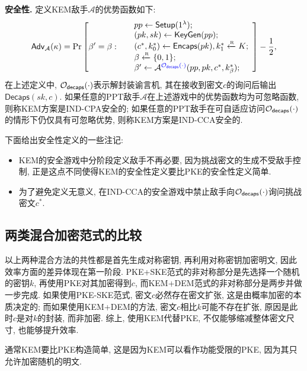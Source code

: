 \begin{trivlist}
\item \textbf{安全性.} 定义KEM敌手$\mathcal{A}$的优势函数如下: 
\begin{displaymath}
\mathsf{Adv}_\mathcal{A}(\kappa) = \Pr \left[ \beta' = \beta:~
	\begin{array}{ll}
		& pp \leftarrow \mathsf{Setup}(1^\lambda); \\		
		& (pk, sk) \leftarrow \mathsf{KeyGen}(pp);\\
        & (c^*, k_0^*) \leftarrow \mathsf{Encaps}(pk), k_1^* \xleftarrow{\textup{\tiny R}} K;\\
		& \beta \xleftarrow{\textup{\tiny R}} \{0,1\};\\ 
        & \beta' \leftarrow \mathcal{A}^{{\color{blue} \mathcal{O}_\mathsf{decaps}(\cdot)}}(pp, pk, c^*, k_\beta^*);
	\end{array} 
\right] - \frac{1}{2},
\end{displaymath}
在上述定义中, $\mathcal{O}_\mathsf{decaps}(\cdot)$表示解封装谕言机, 其在接收到密文$c$的询问后输出$\mathsf{Decaps}(sk, c)$. 
如果任意的PPT敌手$\mathcal{A}$在上述游戏中的优势函数均为可忽略函数, 则称KEM方案是IND-CPA安全的;   
如果任意的PPT敌手在可自适应访问$\mathcal{O}_\mathsf{decaps}(\cdot)$的情形下仍仅具有可忽略优势, 则称KEM方案是IND-CCA安全的. 
\end{trivlist}

下面给出安全性定义的一些注记: 
\begin{itemize}
\item KEM的安全游戏中分阶段定义敌手不再必要, 因为挑战密文的生成不受敌手控制, 
	正是这点不同使得KEM的安全性定义要比PKE的安全性定义简单. 

\item 为了避免定义无意义, 在IND-CCA的安全游戏中禁止敌手向$\mathcal{O}_\mathsf{decaps}(\cdot)$询问挑战密文$c^*$.  
\end{itemize}


\subsection{两类混合加密范式的比较}
以上两种混合方法的共性都是首先生成对称密钥, 再利用对称密钥加密明文, 因此效率方面的差异体现在第一阶段. 
PKE+SKE范式的非对称部分是先选择一个随机的密钥$k$, 再使用PKE对其加密得到$c$, 而KEM+DEM范式的非对称部分是两步并做一步完成. 
如果使用PKE-SKE范式, 密文$c$必然存在密文扩张, 这是由概率加密的本质决定的; 
而如果使用KEM+DEM的方法, 密文$c$相比$k$可能不存在扩张, 原因是此时$c$是对$k$的封装, 而非加密. 
综上, 使用KEM代替PKE, 不仅能够缩减整体密文尺寸, 也能够提升效率. 
\begin{remark}
通常KEM要比PKE构造简单, 这是因为KEM可以看作功能受限的PKE, 因为其只允许加密随机的明文.
\end{remark}


